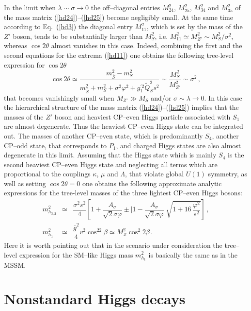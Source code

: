 \documentclass[12pt,a4paper]{article}
\newcommand{\be}{\begin{equation}}
\newcommand{\ee}{\end{equation}}
\newcommand{\ba}{\begin{array}}
\newcommand{\ea}{\end{array}}
\begin{document}
In the limit when $\lambda \sim \sigma \to 0 $  the off--diagonal entries $M_{24}^2$, $M_{25}^2$, $M_{34}^2$
and $M_{35}^2$ of the mass matrix (\ref{hd24})--(\ref{hd25}) become negligibly small. At the same time
according to Eq.~(\ref{hd3}) the diagonal entry $M_{11}^2$, which is set by the mass of the $Z'$ boson, tends
to be substantially larger than $M_S^2$, i.e. $M_{11}^2\simeq M_{Z'}^2 \sim M_S^2/\sigma^2$, whereas
$\cos 2\theta$ almost vanishes in this case. Indeed, combining the first and the second equations for the extrema
(\ref{hd11}) one obtains the following tree-level expression for $\cos 2\theta$
\be
\cos 2\theta \simeq
\dfrac{m_{\overline{S}}^2-m_{S}^2}{m_{\overline{S}}^2+m_S^2+\sigma^2\varphi^2+g^{'2}_1 \tilde{Q}_S^2 s^2}
\sim \dfrac{M_S^2}{M_{Z'}^2}\sim \sigma^2\,,
\label{hd27}
\ee
that becomes vanishingly small when $M_{Z'}\gg M_S$ and/or $\sigma\sim \lambda\to 0$. In this case the  hierarchical structure
of the mass matrix (\ref{hd24})--(\ref{hd25}) implies that the masses of the $Z'$ boson and  heaviest CP--even Higgs particle
associated with $S_1$ are almost degenerate. Thus the heaviest CP--even Higgs state can be integrated out. The masses of
another CP--even state, which is predominantly $S_4$, another CP--odd state, that corresponds to $P_1$, and charged Higgs states
are also almost degenerate in this limit. Assuming that the Higgs state which is mainly $S_4$ is the second heaviest CP--even Higgs
state and neglecting all terms which are proportional to the couplings $\kappa$, $\mu$ and $\Lambda$, that violate global $U(1)$
symmetry, as well as setting $\cos 2\theta=0$ one obtains the following approximate analytic expressions for the tree-level
masses of the three lightest CP--even Higgs bosons:
\be
\ba{lcl}
m_{h_{3,2}}^2 & \simeq & \dfrac{\sigma^2 s^2}{4}\left[1+\dfrac{A_{\sigma}}{\sqrt{2}\sigma \varphi} \pm
\biggl|1 - \dfrac{A_{\sigma}}{\sqrt{2}\sigma \varphi}\biggr|\sqrt{1+16\,\dfrac{\varphi^2}{s^2}}\right]\,,\\[2mm]
m_{h_{1}}^2 & \simeq & \dfrac{\bar{g}^2}{4}v^2\cos^22\beta\simeq M_{Z}^2 \cos^2 2\beta\,.
\ea
\label{hd28}
\ee
Here it is worth pointing out that in the scenario under consideration the tree--level expression for the SM--like Higgs mass
$m_{h_{1}}^2$ is basically the same as in the MSSM.



\section{Nonstandard Higgs decays}
\end{document}
